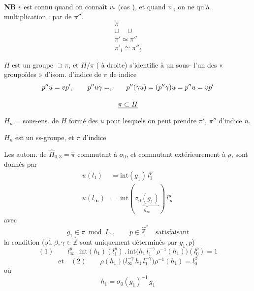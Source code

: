 \documentclass[11pt,a4paper]{article}
\begin{document}
\textbf{NB} $v$ est connu quand on connaît $v_*$ (cas  \ill{}),
et quand $v$  , on ne  \ill{}
 qu'à \ill{} multiplication :  par 
 de $\pi''$.
\[
\begin{array}{c}
\pi \\
\cup \quad \cup \\
\pi' \simeq \pi'' \\
\pi'_i \simeq \pi''_i
\end{array}
\]

$H$ est un groupe $\supset \pi$, et $H/\pi$ ( à droite)
s'identifie à un sous-\ill{}  l'un des « groupoïdes »
d'isom. \struck{\ill{}}  d'indice \ill{} de $\pi$ de
\ill{} indice
\[
p'' u = v p', \qquad \struck{p'' u \gamma =}, \qquad
p''(\gamma u) = (p''\gamma) u = p'' u = v p'
\]
\[
\struck{\pi \subset H}
\]
$H_n$ = sous-ens. de $H$ formé des $u$ pour lesquels on peut prendre
$\pi'$, $\pi''$ d'indice $n$.

$H_n$ est un ss-groupe, et $\pi$ d'indice



Les autom.  de $\hat\Pi_{0,3} = \hat\pi$ commutant \struck{\ill{}} à
$\sigma_0$, et commutant extérieurement à $\rho$, sont donnés par
\[
\begin{aligned}
u(l_1) &= \mathrm{int}(g_1)\, l_1^{p} \\
u(l_\infty) &= \mathrm{int}(\underbrace{\sigma_0(g_1)}_{g_\infty})\, l_\infty^{p}
\end{aligned}
\]
avec
\[
g_1 \in \pi \bmod L_1, \qquad p \in \hat{\mathbb{Z}}^{*} \quad \text{satisfaisant}
\]
la condition (où $\beta, \gamma \in \hat{\mathbb{Z}}$ sont uniquement déterminés
par $g_1, p$)
\[
(1) \qquad \boxed{l_\infty^{p}\,.\,\mathrm{int}(h_1)(l_1^{p})\,.\,
\mathrm{int}\bigl(h_1\, l_1^{-\gamma}\, \rho^{-1}(h_1)\bigr)(l_0^{p}) = 1}
\]
\[
\text{et} \quad (2) \qquad \boxed{\rho(h_1)\bigl(l_\infty^{-\gamma}\, h_1\, l_1^{-\gamma}\bigr)\rho^{-1}(h_1) = l_0^{\beta}}
\]
où
\[
h_1 = \sigma_0(g_1)^{-1}\, g_1
\]


\end{document}
